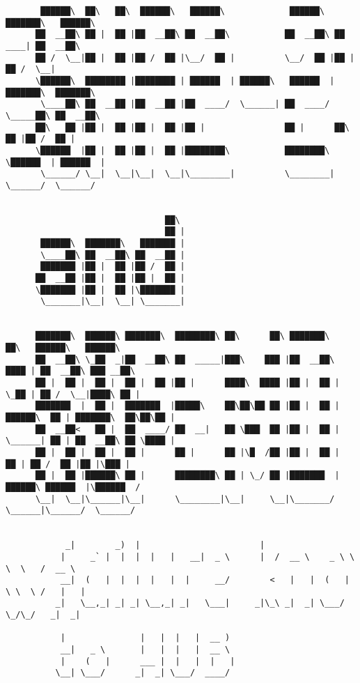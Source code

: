 \documentclass[varwidth=\maxdimen,margin=0.5cm,multi={verbatim}]{standalone}
\begin{document}
\begin{verbatim}
       ██████\  ██\   ██\  ██████\   ██████\             ██████\  ███████\   ██████\
      ██  __██\ ██ |  ██ |██  __██\ ██  __██\           ██  __██\ ██  ____| ██  __██\
      ██ /  \__|██ |  ██ |██ /  ██ |\__/  ██ |          \__/  ██ |██ |      ██ /  \__|
      \██████\  ████████ |████████ | ██████  | ██████\   ██████  |███████\  ███████\
       \____██\ ██  __██ |██  __██ |██  ____/  \______| ██  ____/ \_____██\ ██  __██\
      ██\   ██ |██ |  ██ |██ |  ██ |██ |                ██ |      ██\   ██ |██ /  ██ |
      \██████  |██ |  ██ |██ |  ██ |████████\           ████████\ \██████  | ██████  |
       \______/ \__|  \__|\__|  \__|\________|          \________| \______/  \______/


                                ██\
                                ██ |
       ██████\  ███████\   ███████ |
       \____██\ ██  __██\ ██  __██ |
       ███████ |██ |  ██ |██ /  ██ |
      ██  __██ |██ |  ██ |██ |  ██ |
      \███████ |██ |  ██ |\███████ |
       \_______|\__|  \__| \_______|


      ███████\  ██████\ ███████\  ████████\ ██\      ██\ ███████\            ██\   ██████\   ██████\
      ██  __██\ \_██  _|██  __██\ ██  _____|███\    ███ |██  __██\         ████ | ██  __██\ ███ __██\
      ██ |  ██ |  ██ |  ██ |  ██ |██ |      ████\  ████ |██ |  ██ |        \_██ | ██ /  \__|████\ ██ |
      ███████  |  ██ |  ███████  |█████\    ██\██\██ ██ |██ |  ██ | ██████\  ██ | ███████\  ██\██\██ |
      ██  __██<   ██ |  ██  ____/ ██  __|   ██ \███  ██ |██ |  ██ | \______| ██ | ██  __██\ ██ \████ |
      ██ |  ██ |  ██ |  ██ |      ██ |      ██ |\█  /██ |██ |  ██ |          ██ | ██ /  ██ |██ |\███ |
      ██ |  ██ |██████\ ██ |      ████████\ ██ | \_/ ██ |███████  |        ██████\ ██████  |\██████  /
      \__|  \__|\______|\__|      \________|\__|     \__|\_______/         \______|\______/  \______/


            _|        _)  |                        |
           |     _` |  |  |  |   |   __|  _ \      |  /  __ \    _ \ \ \  \   /  __ \
           __|  (   |  |  |  |   |  |     __/        <   |   |  (   | \ \  \ /   |   |
          _|   \__,_| _| _| \__,_| _|   \___|     _|\_\ _|  _| \___/   \_/\_/   _|  _|

           |               |   |  |   |  __ )
           __|   _ \       |   |  |   |  __ \
           |    (   |      ___ |  |   |  |   |
          \__| \___/      _|  _| \___/  ____/




\end{verbatim}
\end{document}
